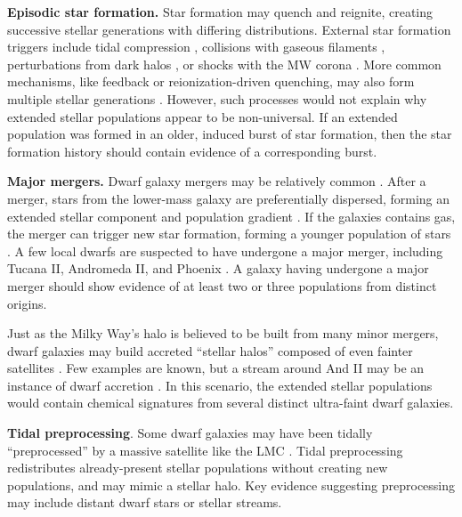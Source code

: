 \textbf{Episodic star formation.} Star formation may quench and
reignite, creating successive stellar generations with differing
distributions. External star formation triggers include tidal
compression \citep{mayer+2001a, dong+lin+murray2003}, collisions with
gaseous filaments \citep{genina+2019}, perturbations from dark halos
\citep{starkenburg+helmi+sales2016}, or shocks with the MW corona
\citep{wright+2019}. More common mechanisms, like feedback or
reionization-driven quenching, may also form multiple stellar
generations
\citep{kawata+2006, benitez-llambay+2015, revaz+jablonka2018}. However,
such processes would not explain why extended stellar populations appear
to be non-universal. If an extended population was formed in an older,
induced burst of star formation, then the star formation history should
contain evidence of a corresponding burst.

\textbf{Major mergers.} Dwarf galaxy mergers may be relatively common
\citep{deason+wetzel+garrison-kimmel2014}. After a merger, stars from
the lower-mass galaxy are preferentially dispersed, forming an extended
stellar component and population gradient
\citep{benitez-llambay+2016, deason+2022}. If the galaxies contains gas,
the merger can trigger new star formation, forming a younger population
of stars \citep[e.g.,][]{genina+2019}. A few local dwarfs are suspected
to have undergone a major merger, including Tucana II, Andromeda II, and
Phoenix
\citep{lokas+2014, fouquet+2017, tarumi+yoshida+frebel2021, cardona-barrero+2021, querci+2025}.
A galaxy having undergone a major merger should show evidence of at
least two or three populations from distinct origins.

Just as the Milky Way's halo is believed to be built from many minor
mergers, dwarf galaxies may build accreted ``stellar halos'' composed of
even fainter satellites \citep{ricotti+polisensky+cleland2022}. Few
examples are known, but a stream around And II may be an instance of
dwarf accretion \citep{amorisco+evans+vandeven2014, roederer+2023}. In
this scenario, the extended stellar populations would contain chemical
signatures from several distinct ultra-faint dwarf galaxies.

\textbf{Tidal preprocessing}. Some dwarf galaxies may have been tidally
``preprocessed'' by a massive satellite like the LMC
\citep[e.g.,][]{santistevan+2023, riley+2024}. Tidal preprocessing
redistributes already-present stellar populations without creating new
populations, and may mimic a stellar halo. Key evidence suggesting
preprocessing may include distant dwarf stars or stellar streams.

